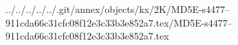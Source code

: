 ../../../../../.git/annex/objects/kx/2K/MD5E-s4477--911cda66c31cfc08f12e3c33b3e852a7.tex/MD5E-s4477--911cda66c31cfc08f12e3c33b3e852a7.tex